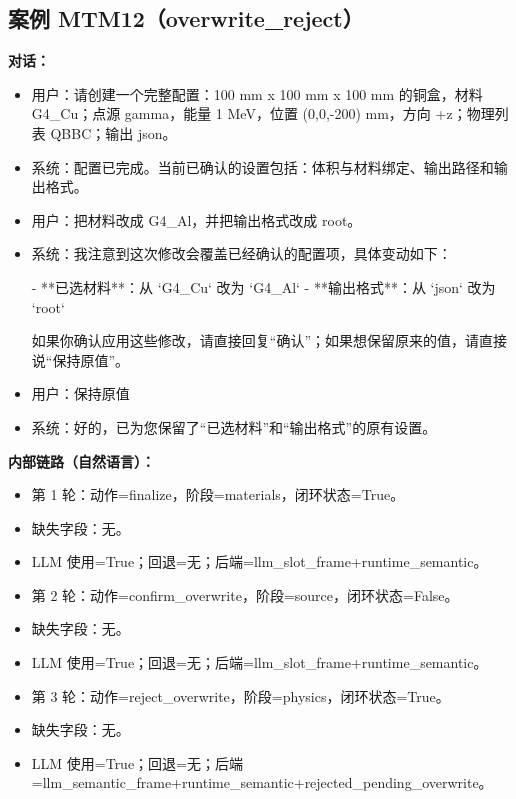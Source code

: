 \documentclass[11pt]{ctexart}
\begin{document}
\subsection{案例 MTM12（overwrite\_reject）}
\textbf{对话：}
\begin{itemize}
\item 用户：请创建一个完整配置：100 mm x 100 mm x 100 mm 的铜盒，材料 G4\_Cu；点源 gamma，能量 1 MeV，位置 (0,0,-200) mm，方向 +z；物理列表 QBBC；输出 json。
\item 系统：配置已完成。当前已确认的设置包括：体积与材料绑定、输出路径和输出格式。
\item 用户：把材料改成 G4\_Al，并把输出格式改成 root。
\item 系统：我注意到这次修改会覆盖已经确认的配置项，具体变动如下：

- **已选材料**：从 `G4\_Cu` 改为 `G4\_Al`
- **输出格式**：从 `json` 改为 `root`

如果你确认应用这些修改，请直接回复“确认”；如果想保留原来的值，请直接说“保持原值”。
\item 用户：保持原值
\item 系统：好的，已为您保留了“已选材料”和“输出格式”的原有设置。
\end{itemize}
\textbf{内部链路（自然语言）：}
\begin{itemize}
\item 第 1 轮：动作=finalize，阶段=materials，闭环状态=True。
\item 缺失字段：无。
\item LLM 使用=True；回退=无；后端=llm\_slot\_frame+runtime\_semantic。
\item 第 2 轮：动作=confirm\_overwrite，阶段=source，闭环状态=False。
\item 缺失字段：无。
\item LLM 使用=True；回退=无；后端=llm\_slot\_frame+runtime\_semantic。
\item 第 3 轮：动作=reject\_overwrite，阶段=physics，闭环状态=True。
\item 缺失字段：无。
\item LLM 使用=True；回退=无；后端=llm\_semantic\_frame+runtime\_semantic+rejected\_pending\_overwrite。
\end{itemize}
\end{document}
